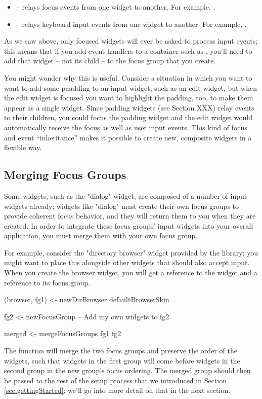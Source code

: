 \begin{itemize}
\item {} -- relays focus events from one widget to
  another.  For example, .
\item {} -- relays keyboard input events from one
  widget to another.  For example, .
\end{itemize}

As we saw above, only focused widgets will ever be asked to process
input events; this means that if you add event handlers to a container
such as , you'll need to add that widget -- not its child
-- to the focus group that you create.

You might wonder why this is useful.  Consider a situation in which
you want to want to add some paadding to an input widget, such as an
edit widget, but when the edit widget is focused you want to highlight
the padding, too, to make them appear as a single widget.  Since
padding widgets (see Section XXX) relay events to their children, you
could focus the padding widget and the edit widget would automatically
receive the focus as well as user input events.  This kind of focus
and event ``inheritance'' makes it possible to create new, composite
widgets in a flexible way.

\subsection{Merging Focus Groups}
\label{sec:merging_focus_groups}

Some widgets, such as the "dialog" widget, are composed of a number of
input widgets already; widgets like "dialog" must create their own
focus groups to provide coherent focus behavior, and they will return
them to you when they are created.  In order to integrate these focus
groups' input widgets into your overall application, you must merge
them with your own focus group.

For example, consider the "directory browser" widget provided by the
library; you might want to place this alongside other widgets that
should also accept input.  When you create the browser widget, you will
get a reference to the widget and a reference to its focus group.

\begin{haskellcode}
 (browser, fg1) <- newDirBrowser defaultBrowserSkin

 fg2 <- newFocusGroup
 -- Add my own widgets to fg2

 merged <- mergeFocusGroups fg1 fg2
\end{haskellcode}

The  function will merge the two focus groups and
preserve the order of the widgets, such that widgets in the first
group will come before widgets in the second group in the new group's
focus ordering.  The merged group should then be passed to the rest of
the setup process that we introduced in Section
\ref{sec:gettingStarted}; we'll go into more detail on that in the
next section.
